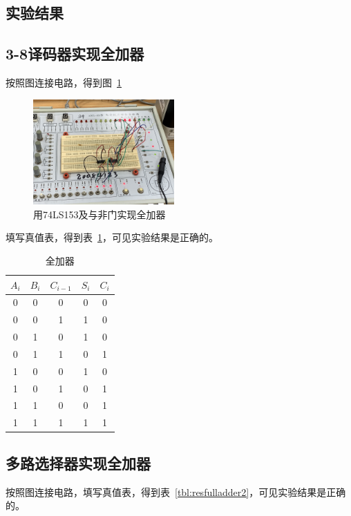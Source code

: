 \documentclass[a4paper,twoside]{ctexart}
\begin{document}
\begin{spacing}{1.2}
\section{实验结果}

\subsection{3-8译码器实现全加器}

按照图连接电路，得到图~\ref{fig:resfulladder153}

\begin{figure}[htbp]
	\centering
	\caption{用74LS153及与非门实现全加器}
	\label{fig:resfulladder153}
	\includegraphics[width=0.48\textwidth]{images/42.JPG}
\end{figure}


填写真值表，得到表~\ref{tbl:resfulladder1}，可见实验结果是正确的。

\begin{table}[htbp]
	\centering
	\caption{全加器}
	\label{tbl:resfulladder1}
	\begin{tabular}{ccc|cc}
		\toprule
		\hline
		$A_i$&$B_i$&$C_{i-1}$&$S_i$&$C_i$\\
		\hline
		0&0&0&0&0\\
		0&0&1&1&0\\
		0&1&0&1&0\\
		0&1&1&0&1\\
		1&0&0&1&0\\
		1&0&1&0&1\\
		1&1&0&0&1\\
		1&1&1&1&1\\
		\hline
		\bottomrule
	\end{tabular}
\end{table}

\subsection{多路选择器实现全加器}

按照图连接电路，填写真值表，得到表~\ref{tbl:resfulladder2}，可见实验结果是正确的。


\end{spacing}
\end{document}

